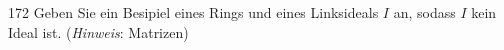 \begin{algebraUE}{172}
Geben Sie ein Besipiel eines Rings und eines Linksideals $I$ an, sodass $I$ kein Ideal ist.
(\textit{Hinweis}: Matrizen)
\end{algebraUE}
\begin{solution}
\leavevmode \\

\end{solution}
